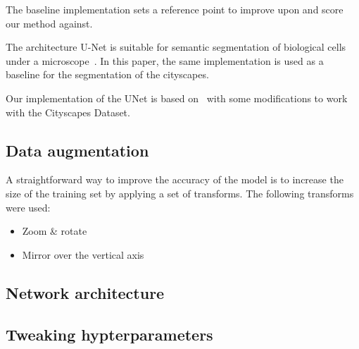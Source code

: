 The baseline implementation sets a reference point to improve upon and score our method against.

The architecture U-Net is suitable for semantic segmentation of biological cells under a microscope~\cite{RonnebergerFB15}. 
In this paper, the same implementation is used as a baseline for the segmentation of the cityscapes.

Our implementation of the UNet is based on~\cite{GH-Pytorch-UNet2018} with some modifications to work with the Cityscapes Dataset.

\subsection{Data augmentation}
\label{subsec:data-augmentation}

A straightforward way to improve the accuracy of the model is to increase the size of the training set by applying a set of transforms. The following transforms were used:
\begin{itemize}
    \item Zoom \& rotate
    \item Mirror over the vertical axis
\end{itemize}

\subsection{Network architecture}
\label{subsec:network-architecture}

\subsection{Tweaking hypterparameters}


